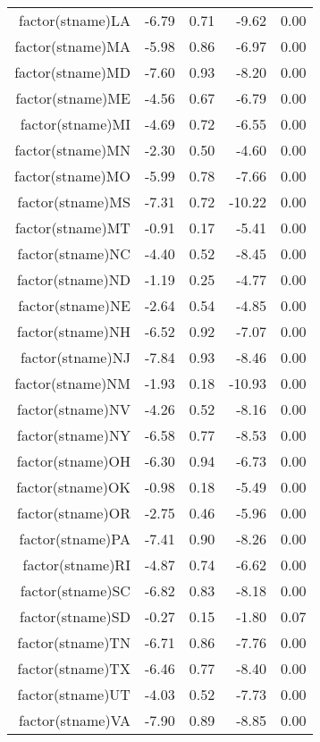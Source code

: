 \begin{table}[ht]
\begin{tabular}{rrrrr}
  factor(stname)LA & -6.79 & 0.71 & -9.62 & 0.00 \\ 
  factor(stname)MA & -5.98 & 0.86 & -6.97 & 0.00 \\ 
  factor(stname)MD & -7.60 & 0.93 & -8.20 & 0.00 \\ 
  factor(stname)ME & -4.56 & 0.67 & -6.79 & 0.00 \\ 
  factor(stname)MI & -4.69 & 0.72 & -6.55 & 0.00 \\ 
  factor(stname)MN & -2.30 & 0.50 & -4.60 & 0.00 \\ 
  factor(stname)MO & -5.99 & 0.78 & -7.66 & 0.00 \\ 
  factor(stname)MS & -7.31 & 0.72 & -10.22 & 0.00 \\ 
  factor(stname)MT & -0.91 & 0.17 & -5.41 & 0.00 \\ 
  factor(stname)NC & -4.40 & 0.52 & -8.45 & 0.00 \\ 
  factor(stname)ND & -1.19 & 0.25 & -4.77 & 0.00 \\ 
  factor(stname)NE & -2.64 & 0.54 & -4.85 & 0.00 \\ 
  factor(stname)NH & -6.52 & 0.92 & -7.07 & 0.00 \\ 
  factor(stname)NJ & -7.84 & 0.93 & -8.46 & 0.00 \\ 
  factor(stname)NM & -1.93 & 0.18 & -10.93 & 0.00 \\ 
  factor(stname)NV & -4.26 & 0.52 & -8.16 & 0.00 \\ 
  factor(stname)NY & -6.58 & 0.77 & -8.53 & 0.00 \\ 
  factor(stname)OH & -6.30 & 0.94 & -6.73 & 0.00 \\ 
  factor(stname)OK & -0.98 & 0.18 & -5.49 & 0.00 \\ 
  factor(stname)OR & -2.75 & 0.46 & -5.96 & 0.00 \\ 
  factor(stname)PA & -7.41 & 0.90 & -8.26 & 0.00 \\ 
  factor(stname)RI & -4.87 & 0.74 & -6.62 & 0.00 \\ 
  factor(stname)SC & -6.82 & 0.83 & -8.18 & 0.00 \\ 
  factor(stname)SD & -0.27 & 0.15 & -1.80 & 0.07 \\ 
  factor(stname)TN & -6.71 & 0.86 & -7.76 & 0.00 \\ 
  factor(stname)TX & -6.46 & 0.77 & -8.40 & 0.00 \\ 
  factor(stname)UT & -4.03 & 0.52 & -7.73 & 0.00 \\ 
  factor(stname)VA & -7.90 & 0.89 & -8.85 & 0.00 \\ 

\end{tabular}
\end{table}
